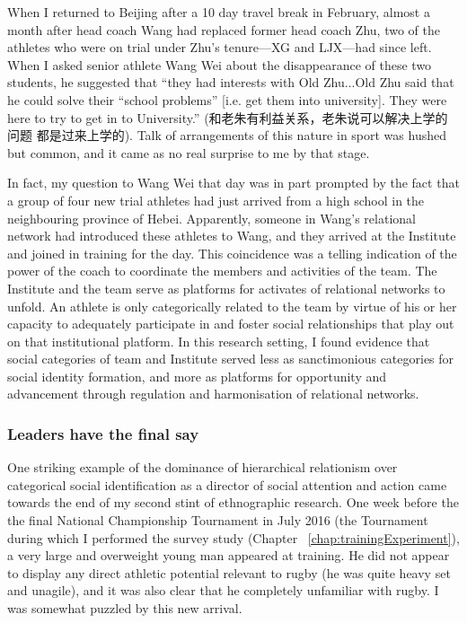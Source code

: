 \begin{CJK}{UTF8}{gbsn}
When I returned to Beijing after a 10 day travel break in February, almost a month after head coach Wang had replaced former head coach Zhu, two of the athletes who were on trial under Zhu's tenure---XG and LJX---had since left.  When I asked senior athlete Wang Wei about the disappearance of these two students, he suggested that ``they had interests with Old Zhu...Old Zhu said that he could solve their ``school problems'' [i.e. get them into university]. They were here to try to get in to University.'' (和老朱有利益关系，老朱说可以解决上学的问题 都是过来上学的). Talk of arrangements of this nature in sport was hushed but common, and it came as no real surprise to me by that stage.

In fact, my question to Wang Wei that day was in part prompted by the fact that a group of four new trial athletes had just arrived from a high school in the neighbouring province of Hebei.  Apparently, someone in Wang's relational network had introduced these athletes to Wang, and they arrived at the Institute and joined in training for the day.  This coincidence was a telling indication of the power of the coach to coordinate the members and activities of the team.  The Institute and the team serve as platforms for activates of relational networks to unfold.  An athlete is only categorically related to the team by virtue of his or her capacity to adequately participate in and foster social relationships that play out on that institutional platform.  In this research setting, I found evidence that social categories of team and Institute served less as sanctimonious categories for social identity formation, and more as platforms for opportunity and advancement through regulation and harmonisation of relational networks.

\subsubsection{Leaders have the final say\label{sect:leadersFinalSay}}
One striking example of the dominance of hierarchical relationism over categorical social identification as a director of social attention and action came towards the end of my second stint of ethnographic research. One week before the the final National Championship Tournament in July 2016 (the Tournament during which I performed the survey study (Chapter ~\ref{chap:trainingExperiment}), a very large and overweight young man appeared at training.  He did not appear to display any direct athletic potential relevant to rugby (he was quite heavy set and unagile), and it was also clear that he completely unfamiliar with rugby.  I was somewhat puzzled by this new arrival.


\end{CJK}
